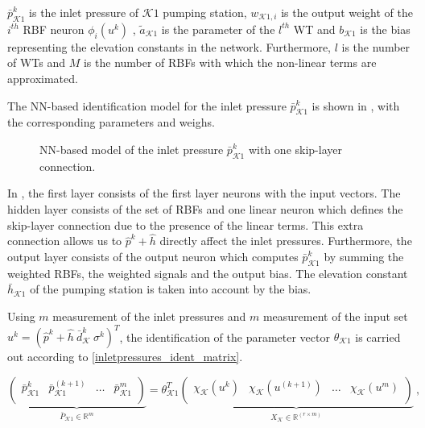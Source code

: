 $\bar{p}^{k}_{\mathcal{K}1}$ is the inlet pressure of $\mathcal{K}1$ pumping station, $w_{\mathcal{K}1,i}$ is the output weight of the $i^{th}$ RBF neuron $\phi_i(u^k)$ , $\tilde{a}_{\mathcal{K}1} $ is the parameter of the $l^{th}$ WT and $b_{\mathcal{K}1}$ is the bias representing the elevation constants in the network. Furthermore, $l$ is the number of WTs and $M$ is the number of RBFs with which the non-linear terms are approximated. 

The NN-based identification model for the inlet pressure $\bar{p}^{k}_{\mathcal{K}1}$ is shown in , with the corresponding  parameters and weighs.

 \begin{figure}[H]
 \centering
 \hspace*{1.7cm} 
  \vspace{-8mm}
 \caption{NN-based model of the inlet pressure $\bar{p}^k_{\mathcal{K}1} $ with one skip-layer connection.}
 \label{fig:nn_output}
 \end{figure}

 \vspace{-3mm}

 In , the first layer consists of the first layer neurons with the input vectors. The hidden layer consists of the set of RBFs and one linear neuron which defines the skip-layer connection due to the presence of the linear terms. This extra connection allows us to $\hat{p}^{k} \!+\! \hat{h}$ directly affect the inlet pressures. Furthermore, the output layer consists of the output neuron which computes $\bar{p}^{k}_{\mathcal{K}1}$ by summing the weighted RBFs, the weighted signals and the output bias. The elevation constant $\bar{h}_{\mathcal{K}1}$ of the pumping station is taken into account by the bias. 

Using $m$ measurement of the inlet pressures and $m$ measurement of the input set $u^k = ( \hat{p}^{k}\! + \!\hat{h} \ \bar{d}^{k}_{\mathcal{K}} \ \sigma^{k} )^T$, the identification of the parameter vector $\theta_{\mathcal{K}1}$ is carried out according to \eqref{inletpressures_ident_matrix}. 

  \begin{equation}
\label{inletpressures_ident_matrix}
\underbrace{\begin{pmatrix}
           \bar{p}^{k}_{\mathcal{K}1} & \bar{p}^{(k+1)}_{\mathcal{K}1} & \hdots & \bar{p}^{m}_{\mathcal{K}1}\\
         \end{pmatrix}}_{\bar{P}_{\mathcal{K}1}  \in  \mathbb{R}^{m}} 
         = \theta^T_{\mathcal{K}1}    
         \underbrace{\begin{pmatrix}
           \chi_{\mathcal{K}}(u^{k}) & \chi_{\mathcal{K}}(u^{(k+1)}) & \hdots & \chi_{\mathcal{K}}(u^{m})\\
         \end{pmatrix}}_{X_{\mathcal{K}} \in \mathbb{R}^{(r \times m)}} \ ,
\end{equation}

